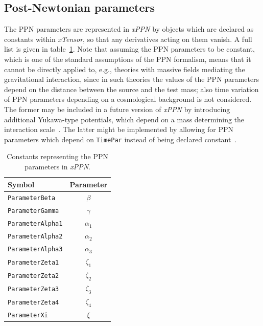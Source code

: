 \documentclass[notitlepage,a4paper,aps,prd,onecolumn,superscriptaddress,nofootinbib,groupedaddress,longbibliography]{revtex4-1}
\newcommand{\xPPN}{\emph{xPPN}}
\newcommand{\xTensor}{\emph{xTensor}}
\begin{document}
\subsection{Post-Newtonian parameters}\label{ssec:ppnpar}
The PPN parameters are represented in \xPPN{} by objects which are declared as constants within \xTensor, so that any derivatives acting on them vanish. A full list is given in table~\ref{tab:ppnpar}. Note that assuming the PPN parameters to be constant, which is one of the standard assumptions of the PPN formalism, means that it cannot be directly applied to, e.g., theories with massive fields mediating the gravitational interaction, since in such theories the values of the PPN parameters depend on the distance between the source and the test mass; also time variation of PPN parameters depending on a cosmological background is not considered. The former may be included in a future version of \xPPN{} by introducing additional Yukawa-type potentials, which depend on a mass determining the interaction scale~\cite{Zaglauer:1990yh,Helbig:1991pk}. The latter might be implemented by allowing for PPN parameters which depend on \lstinline/TimePar/ instead of being declared constant~\cite{Sanghai:2016tbi}.

\begin{table}[htb]
\centering
\begin{tabular}{l|c}
Symbol & Parameter\\\hline
\lstinline/ParameterBeta/ & $\beta$\\
\lstinline/ParameterGamma/ & $\gamma$\\
\lstinline/ParameterAlpha1/ & $\alpha_1$\\
\lstinline/ParameterAlpha2/ & $\alpha_2$\\
\lstinline/ParameterAlpha3/ & $\alpha_3$\\
\lstinline/ParameterZeta1/ & $\zeta_1$\\
\lstinline/ParameterZeta2/ & $\zeta_2$\\
\lstinline/ParameterZeta3/ & $\zeta_3$\\
\lstinline/ParameterZeta4/ & $\zeta_4$\\
\lstinline/ParameterXi/ & $\xi$
\end{tabular}
\caption{Constants representing the PPN parameters in \xPPN.}
\label{tab:ppnpar}
\end{table}
\end{document}
